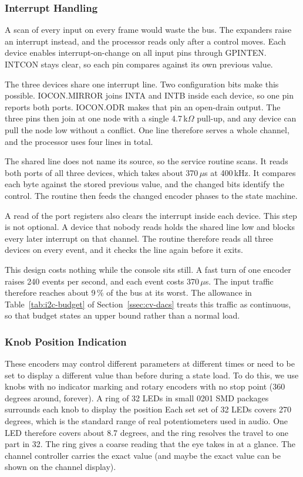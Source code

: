\documentclass[11pt, letterpaper,titlepage]{article}
\begin{document}
\subsubsection*{Interrupt Handling}
\label{sssec:gpio-interrupts}

A scan of every input on every frame would waste the bus. The expanders raise an
interrupt instead, and the processor reads only after a control moves. Each
device enables interrupt-on-change on all input pins through GPINTEN. INTCON
stays clear, so each pin compares against its own previous value.

The three devices share one interrupt line. Two configuration bits make this
possible. IOCON.MIRROR joins INTA and INTB inside each device, so one pin
reports both ports. IOCON.ODR makes that pin an open-drain output. The three
pins then join at one node with a single 4.7\,k$\Omega$ pull-up, and any device
can pull the node low without a conflict. One line therefore serves a whole
channel, and the processor uses four lines in total.

The shared line does not name its source, so the service routine scans. It reads
both ports of all three devices, which takes about 370\,$\mu$s at 400\,kHz. It
compares each byte against the stored previous value, and the changed bits
identify the control. The routine then feeds the changed encoder phases to the
state machine.

A read of the port registers also clears the interrupt inside each device. This
step is not optional. A device that nobody reads holds the shared line low and
blocks every later interrupt on that channel. The routine therefore reads all
three devices on every event, and it checks the line again before it exits.

This design costs nothing while the console sits still. A fast turn of one
encoder raises 240 events per second, and each event costs 370\,$\mu$s. The
input traffic therefore reaches about 9\,\% of the bus at its worst. The
allowance in Table~\ref{tab:i2c-budget} of Section~\ref{ssec:cv-dacs} treats this
traffic as continuous, so that budget states an upper bound rather than a normal
load.


\subsubsection*{Knob Position Indication}
\label{sssec:led-rings}
 
These encoders may control different parameters at different times or need to be set to display a different value than before during a state load. To do this, we use knobs with no indicator marking and rotary encoders with no stop point (360 degrees around, forever). A ring of 32 LEDs in small 0201 SMD packages surrounds each knob to display the position Each set set of 32 LEDs covers 270 degrees, which is the standard range of real potentiometers used in audio. One LED therefore covers about
8.7 degrees, and the ring resolves the travel to one part in 32. The ring gives
a coarse reading that the eye takes in at a glance. The channel controller carries
the exact value (and maybe the exact value can be shown on the channel display).
\end{document}
